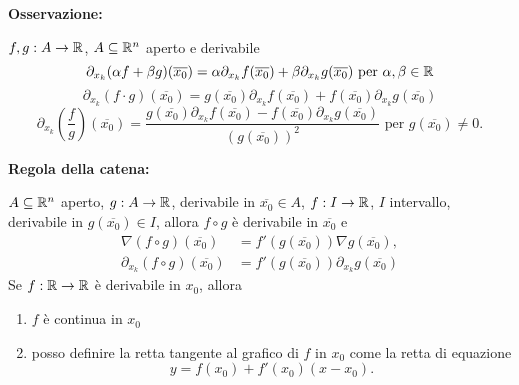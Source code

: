 \begin{attbar}
	\textbf{Osservazione:}
	
	$f,g:A\rightarrow\mathbb{R}$, $A\subseteq\mathbb{R}^n$ aperto e derivabile
	\begin{equation*}
		\partial_{x_k}(\alpha f+\beta g)(\overline{x_0})=\alpha\partial_{x_k}f(\overline{x_0})+\beta\partial_{x_k}g(\overline{x_0}) \text{  per  }   \alpha,\beta\in\mathbb{R}
	\end{equation*}
	\begin{equation*}
		\partial_{x_k}(f\cdot g)(\overline{x_0})=g(\overline{x_0})\partial_{x_k}f(\overline{x_0})+f(\overline{x_0})\partial_{x_k}g(\overline{x_0})
	\end{equation*}
	\begin{equation*}
		\partial_{x_k}\left(\frac{f}{g}\right)(\overline{x_0})=\frac{g(\overline{x_0})\partial_{x_k}f(\overline{x_0})-f(\overline{x_0})\partial_{x_k}g(\overline{x_0})}{(g(\overline{x_0}))^2} \text{  per  } g(\overline{x_0})\neq 0.
	\end{equation*}
\end{attbar}


\begin{attbar}
	\textbf{Regola della catena:}
	
	$A\subseteq \mathbb{R}^n$ aperto, $g:A\rightarrow \mathbb{R}$, derivabile in $\overline{x_0}\in A$, $f:I\rightarrow\mathbb{R}$, $I$ intervallo, derivabile in $g(\overline{x_0})\in I$, allora $f\circ g$ è derivabile in $\overline{x_0}$ e 
	\begin{align*}
		\nabla(f \circ g)(\overline{x_0})&=f'(g(\overline{x_0}))\nabla g(\overline{x_0}),\\
		\partial_{x_k}(f\circ g)(\overline{x_0})&=f'(g(\overline{x_0}))\partial_{x_k}g(\overline{x_0})
	\end{align*}Se $f:\mathbb{R}\rightarrow\mathbb{R}$ è derivabile in $x_0$, allora
	\begin{enumerate}
		\item $f$ è continua in $x_0$
		\item posso definire la retta tangente al grafico di $f$ in $x_0$ come la retta di equazione
		\begin{equation*}
			y=f(x_0)+f'(x_0)(x-x_0).
		\end{equation*}
	\end{enumerate}
\end{attbar}


